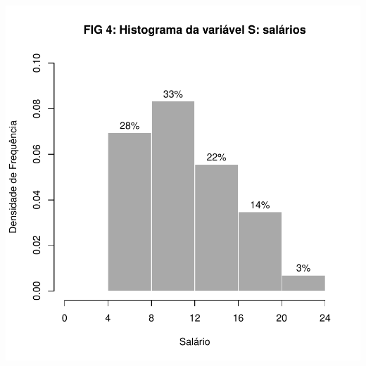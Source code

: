 \documentclass[14pt,aspectratio=1610]{beamer}
\begin{document}
\begin{frame}{}
\frametitle{}
\begin{block}{}
\begin{center}
\includegraphics{Aula5-hist}
\end{center}
\end{block}
\end{frame}
\end{document}
